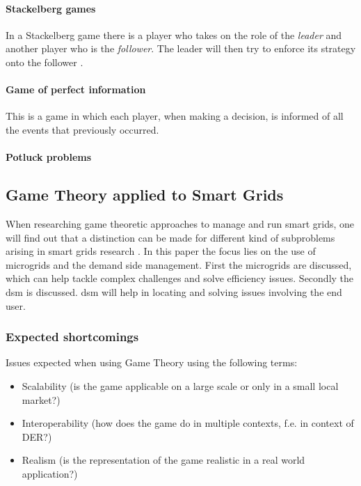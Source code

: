 \paragraph{Stackelberg games}
In a Stackelberg game there is a player who takes on the role of the \textit{leader} and another player who is the \textit{follower}. The leader will then try to enforce its strategy onto the follower \cite{ShohamLeyton-Brown2008}. 
\paragraph{Game of perfect information}
This is a game in which each player, when making a decision, is informed of all the events that previously occurred\cite{CourseInGameTheory}.

\paragraph{Potluck problems}


\subsection{Game Theory applied to Smart Grids}
When researching game theoretic approaches to manage and run smart grids, one will find out that a distinction can be made for different kind of subproblems arising in smart grids research \cite{keypaper}. In this paper the focus lies on the use of microgrids and the demand side management. First the microgrids are discussed, which can help tackle complex challenges and solve efficiency issues. Secondly the \gls{dsm} is discussed. \gls{dsm} will help in locating and solving issues involving the end user. 


\subsubsection{Expected shortcomings}

Issues expected when using Game Theory using the following terms:
\begin{itemize}
	\item Scalability (is the game applicable on a large scale or only in a small local market?)
	\item Interoperability (how does the game do in multiple contexts, f.e. in context of DER?)
	\item Realism (is the representation of the game realistic in a real world application?)
\end{itemize}